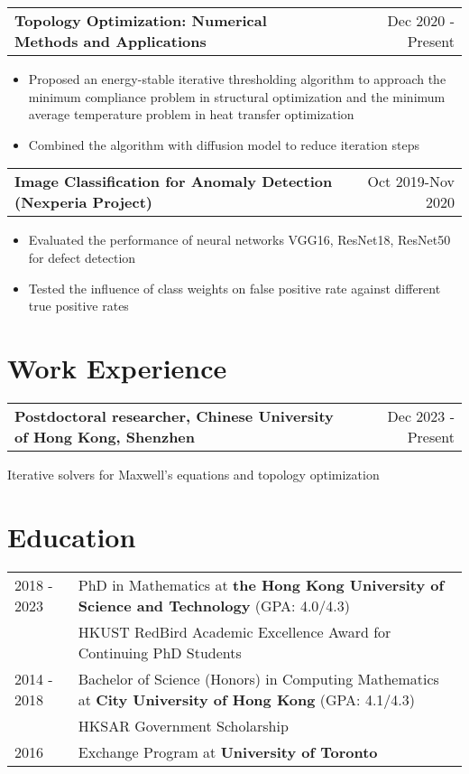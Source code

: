 \documentclass[a4paper,10.5pt]{article}
\makeatletter
\newenvironment{jobshort}[2]
    {
    \begin{tabularx}{\linewidth}{@{}l X r@{}}
    \textbf{#1} & \hfill &  #2 \\[3.75pt]
    \end{tabularx}
    }
    {
    }
\newenvironment{joblong}[2]
    {
    \begin{tabularx}{\linewidth}{@{}l X r@{}}
    \textbf{#1} & \hfill &  #2 \\[3.75pt]
    \end{tabularx}
    \begin{minipage}[t]{\linewidth}
    \begin{itemize}[nosep,after=\strut, leftmargin=1em, itemsep=3pt,label=--]
    }
    {
    \end{itemize}
    \end{minipage}    
    }
\makeatother
\begin{document}
\begin{joblong}{Topology Optimization: Numerical Methods and Applications} {Dec 2020 - Present}
\item Proposed an energy-stable iterative thresholding algorithm to approach the minimum compliance problem in structural optimization and the minimum average temperature problem in heat transfer optimization
\item Combined the algorithm with diffusion model to reduce iteration steps
\end{joblong}

\begin{joblong}{Image Classification for Anomaly Detection (Nexperia Project)} {Oct 2019-Nov 2020}
    \item Evaluated the performance of neural networks VGG16, ResNet18, ResNet50 for defect detection
    \item Tested the influence of class weights on false positive rate against different true positive rates
\end{joblong}
  
\section{Work Experience}
\begin{jobshort}{Postdoctoral researcher, Chinese University of Hong Kong, Shenzhen}{Dec 2023 - Present}
Iterative solvers for Maxwell's equations and topology optimization
\end{jobshort}
\section{Education}
\begin{tabularx}{\linewidth}{@{}l X@{}}	
2018 - 2023 & PhD in Mathematics at \textbf{the Hong Kong University of Science and Technology} \hfill \normalsize (GPA: 4.0/4.3) \\
            & HKUST RedBird Academic Excellence Award for Continuing PhD Students \\
2014 - 2018 & Bachelor of Science (Honors) in Computing Mathematics at \textbf{City University of Hong Kong} \hfill (GPA: 4.1/4.3) \\ 
            & HKSAR Government Scholarship\\
2016 & Exchange Program at \textbf{University of Toronto}
\end{tabularx}
\end{document}

